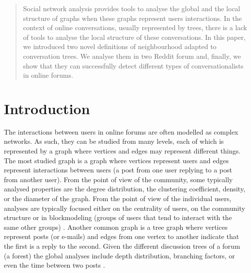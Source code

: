 \documentclass[conference]{IEEEtran}
\begin{document}

\maketitle

\begin{abstract}Social network analysis provides tools to analyse the global and the local structure of graphs when these graphs represent users interactions. In the context of online conversations, usually represented by trees, there is a lack of tools to analyse the local structure of these conversations. In this paper, we introduced two novel definitions of neighbourhood adapted to conversation trees. We analyse them in two Reddit forum and, finally, we show that they can successfully detect different types of conversationalists in online forums. 
\end{abstract}





%
\IEEEpeerreviewmaketitle



\section{Introduction}
The interactions between users in online forums are often modelled as complex networks. As such, they can be studied from many levels, each of which is represented by a graph where vertices and edges may represent different things. The most studied graph is a graph where vertices represent users and edges represent interactions between users (a post from one user replying to a post from another user). From the point of view of the community, some typically analysed properties are the degree distribution, the clustering coefficient, density, or the diameter of the graph. From the point of view of the individual users, analyses are typically focused either on the centrality of users, on the community structure or in blockmodeling (groups of users that tend to interact with the same other groups) \cite{McCallum2007a}. Another common graph is a tree graph where vertices represent posts (or e-mails) and edges from one vertex to another indicate that the first is a reply to the second. Given the different discussion trees of a forum (a forest) the global analyses include depth distribution, branching factors, or even the time between two posts \cite{Bhatt2012, Gaumont2016,Dorat2007}. 
\end{document}
